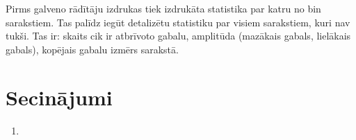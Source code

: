 Pirms galveno rādītāju izdrukas tiek izdrukāta statistika par katru no bin sarakstiem. 
Tas palīdz iegūt detalizētu statistiku par visiem sarakstiem, kuri nav tukši.
Tas ir: skaits cik ir atbrīvoto gabalu, amplitūda (mazākais gabals, lielākais gabals), kopējais gabalu izmērs sarakstā.


\section{Secinājumi}
\begin{enumerate}
\item 
\end{enumerate}


